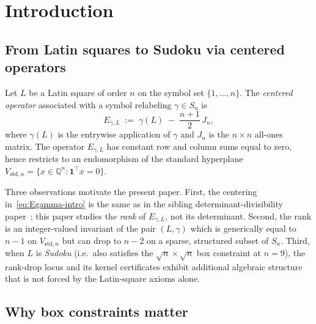 \documentclass[11pt,a4paper]{article}
\theoremstyle{definition}
\theoremstyle{remark}
\providecommand{\one}{\mathbf{1}}
\providecommand{\Q}{\mathbb{Q}}
\newcommand{\Vstdn}{V_{\mathrm{std},n}}
\newcommand{\Egamma}{E_{\gamma,L}}
\begin{document}
\section{Introduction}\label{sec:intro}

\subsection{From Latin squares to Sudoku via centered operators}
\label{sec:intro-centered}

Let $L$ be a Latin square of order $n$ on the symbol set
$\{1, \dots, n\}$. The \emph{centered operator} associated with a
symbol relabeling $\gamma \in S_n$ is
\begin{equation}\label{eq:Egamma-intro}
   \Egamma \;:=\; \gamma(L) \;-\; \frac{n+1}{2}\, J_n,
\end{equation}
where $\gamma(L)$ is the entrywise application of $\gamma$ and $J_n$
is the $n \times n$ all-ones matrix. The operator
$\Egamma$ has constant row and column sums equal to zero, hence
restricts to an endomorphism of the standard hyperplane
$\Vstdn = \{x \in \Q^n : \one^{\!\top} x = 0\}$.

Three observations motivate the present paper. First, the centering
in~\eqref{eq:Egamma-intro} is the same as in the sibling
determinant-divisibility paper~\cite{HAN-DetDivisibility}; this paper
studies the \emph{rank} of $\Egamma$, not its determinant. Second,
the rank is an integer-valued invariant of the pair $(L, \gamma)$
which is generically equal to $n - 1$ on $\Vstdn$ but can drop to
$n - 2$ on a sparse, structured subset of $S_n$. Third, when $L$ is
\emph{Sudoku} (i.e.\ also satisfies the $\sqrt{n} \times \sqrt{n}$ box
constraint at $n = 9$), the rank-drop locus and its kernel
certificates exhibit additional algebraic structure that is not
forced by the Latin-square axioms alone.

\subsection{Why box constraints matter}\label{sec:intro-box}
\end{document}
